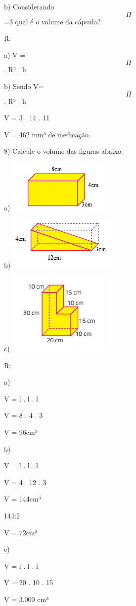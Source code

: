b) Considerando \[\Pi\]=3 qual é o volume da cápsula?

R:

a) V = \[\Pi\] . R² . h

b) Sendo V= \[\Pi\] . R² . h

V = 3 . 14 . 11

V = 462 mm³ de medicação.

8) Calcule o volume das figuras abaixo.

a)
\includegraphics[width=1.94792in,height=0.98958in]{./imgSAEB_8_MAT/media/image51.png}

b)
\includegraphics[width=2.08333in,height=1in]{./imgSAEB_8_MAT/media/image52.png}

c)
\includegraphics[width=1.92708in,height=1.5625in]{./imgSAEB_8_MAT/media/image53.png}

R:

a)

V = l . l . l

V = 8 . 4 . 3

V = 96cm³

b)

V = l . l . l

V = 4 . 12 . 3

V = 144cm³

144:2

V = 72cm³

c)

V = l . l . l

V = 20 . 10 . 15

V = 3.000 cm³

